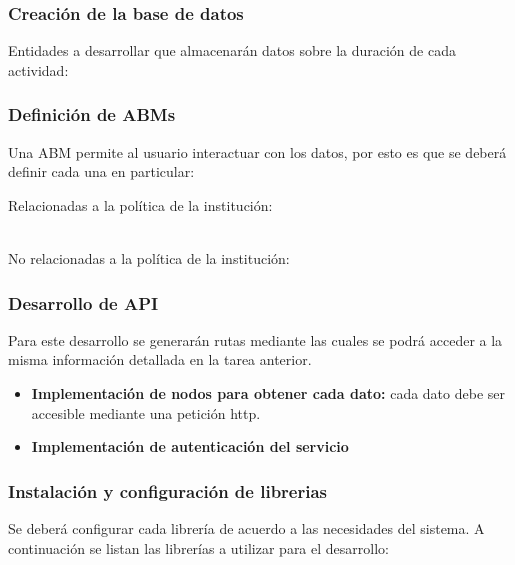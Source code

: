 \documentclass{article}
\begin{document}
\subsubsection{Creación de la base de datos}
\label{ssub:creacioDB}

Entidades a desarrollar que almacenarán datos  sobre la duración de cada actividad:

\begin{itemize}
    
\end{itemize}

\subsubsection{Definición de ABMs}%
\label{ssub:definición_de_abms}


Una ABM permite al usuario interactuar con los datos, por esto es que se deberá definir cada una en particular:\newline

Relacionadas a la política de la institución:
\begin{itemize}
    
\end{itemize}
\ \\No relacionadas a la política de la institución:
\begin{itemize}
    
\end{itemize}

\subsubsection{Desarrollo de API }%
\label{ssub:desarrollo_de_api_}
Para este desarrollo se generarán rutas mediante las cuales se podrá acceder a la misma información detallada en la tarea anterior.

\begin{itemize}
    \item \textbf{Implementación de nodos para obtener cada dato:} cada dato debe ser accesible mediante una petición http.
    \item \textbf{Implementación de autenticación del servicio}
\end{itemize}

\subsubsection{Instalación y configuración de librerias}%
\label{ssub:instalación_y_configuración_de_librerias}
Se deberá configurar cada librería de acuerdo a las necesidades del sistema.
A continuación se listan las librerías a utilizar para el desarrollo:
\end{document}

